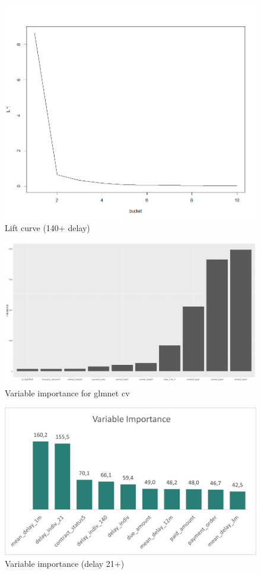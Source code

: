 \documentclass[
]{article}
\begin{document}
\begin{figure}
\centering
\includegraphics{.//lift140.png}
\caption{\label{fig:lift140} Lift curve (140+ delay)}
\end{figure}

\begin{figure}
\includegraphics[width=0.9\linewidth]{delay_varImp} \caption{\label{fig:varIm}Variable importance for glmnet cv}\label{fig:varIm}
\end{figure}

\begin{figure}
\includegraphics[width=0.9\linewidth]{varimp21} \caption{\label{fig:varIm21}Variable importance  (delay 21+)}\label{fig:varIm21}
\end{figure}
\end{document}
